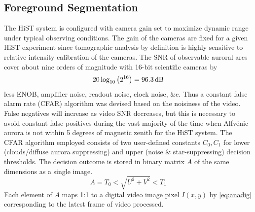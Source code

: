 





\subsection{Foreground Segmentation}\label{sec:seg}
The HiST system is configured with camera gain set to maximize dynamic range under typical observing conditions.
The gain of the cameras are fixed for a given HiST experiment since tomographic analysis by definition is highly sensitive to relative intensity calibration of the cameras.
The SNR of observable auroral arcs cover about nine orders of magnitude with 16-bit scientific cameras by
\begin{equation}
20\log_{10}\left(2^{16}\right) = \unit[96.3]{dB}
\end{equation}
less ENOB, amplifier noise, readout noise, clock noise, \&c.
Thus a constant false alarm rate (CFAR) \citep{cfaroptical} algorithm was devised based on the noisiness of the video.
False negatives will increase as video SNR decreases, but this is necessary to avoid constant false positives during the vast majority of the time when Alfvénic aurora is not within 5 degrees of magnetic zenith for the HiST system.
The CFAR algorithm employed consists of two user-defined constants ${C_0,C_1}$ for lower (clouds/diffuse aurora suppressing) and upper (noise \& star-suppressing) decision thresholds.
The decision outcome is stored in binary matrix $A$ of the same dimensions as a single image.
\begin{equation}
A = T_0 < \sqrt{U^2 + V^2} < T_1
\end{equation}
Each element of $A$ maps 1:1 to a digital video image pixel $I(x,y)$ by \eqref{eq:anadig} corresponding to the latest frame of video processed.



